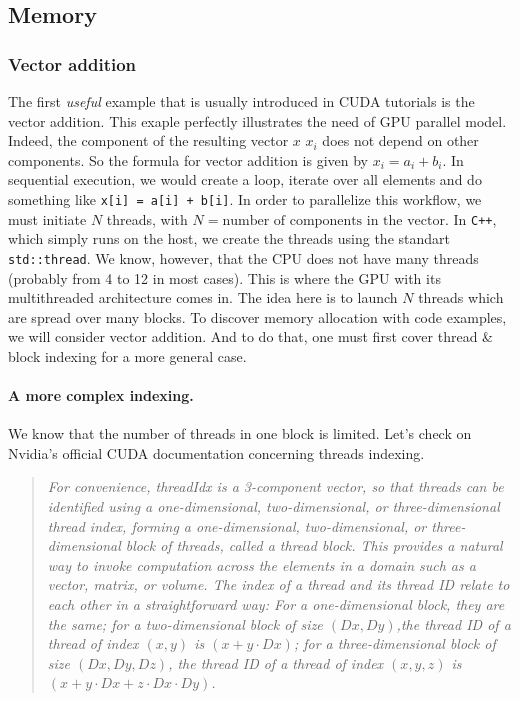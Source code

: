 \subsection{Memory}

\subsubsection{Vector addition}
The first \textit{useful} example 
that is usually introduced in CUDA tutorials is the vector addition. This exaple
perfectly illustrates the need of GPU parallel model. Indeed, the component of the resulting
 vector $x$ $x_i$ does not depend on other components. So the formula for vector addition is given by 
 $x_i = a_i + b_i$. In sequential execution, we would create a loop, iterate over all elements and 
do something like \verb|x[i] = a[i] + b[i]|. In order to parallelize this workflow, we must initiate $N$ 
threads, with $N = \text{number of components in the vector}$. In \verb|C++|, which simply runs on the host, we create the threads 
using the standart \verb|std::thread|. We know, however, that the CPU does not have many threads (probably from 4 to 12 in most cases). 
This is where the GPU with its multithreaded architecture comes in. The idea here is to launch $N$ threads which are spread over many blocks.
\newline 
To discover memory allocation with code examples, we will consider vector addition. And to do that, 
one must first cover thread \& block indexing for a more general case.

\paragraph{A more complex indexing.} 
We know that the number of threads in one 
block is limited. Let's check on Nvidia's official CUDA documentation \cite{center} concerning threads indexing. 
\begin{quote}
   \textsl{For convenience, {\selectfont threadIdx} is a 3-component vector, 
   so that threads can be identified using a one-dimensional, 
   two-dimensional, or three-dimensional thread index, forming a one-dimensional, two-dimensional, 
   or three-dimensional block of threads, called a thread block. This provides a natural way to invoke computation across 
   the elements in a domain such as a vector, matrix, or volume.
   The index of a thread and its thread ID relate to each other 
   in a straightforward way: For a one-dimensional block, they are the same; for 
   a two-dimensional block of size $(Dx, Dy)$,the thread ID of a thread 
   of index $(x, y)$ is $(x + y\cdot Dx)$; for a three-dimensional block of size $(Dx, Dy, Dz)$, the thread ID of a 
   thread of index $(x, y, z)$ is $(x + y\cdot Dx + z\cdot Dx\cdot Dy)$.}
\end{quote}

